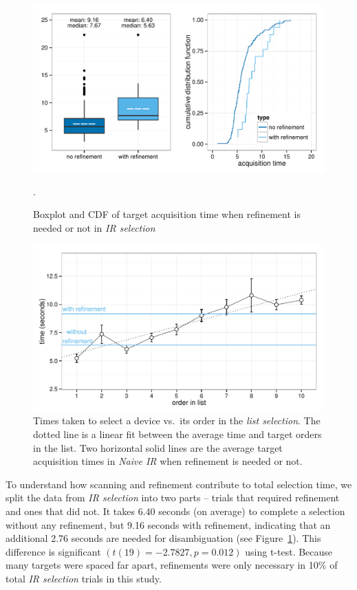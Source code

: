 \begin{figure}[t]
\centering
\includegraphics[width=1.0\columnwidth]{figures/result_study1b.pdf}
\caption{Boxplot and CDF of target acquisition time when refinement is needed or not in {\em IR selection}}.
\label{fig:with_without_refinement}
\end{figure}

\begin{figure}[t]
\centering
\includegraphics[width=1.0\columnwidth]{figures/result_study1c.pdf}
\caption{Times taken to select a device vs.~its order in the {\em list selection}. The dotted line is a linear fit between the average time and target orders in the list. Two horizontal solid lines are the average target acquisition times in {\em Naive IR} when refinement is needed or not.}
\label{fig:time-vs-list-order}
\end{figure}

To understand how scanning and refinement contribute to total selection time, we split the data from {\em IR selection} into two parts -- trials that required refinement and ones that did not. It takes 6.40 seconds (on average) to complete  a selection without any refinement, but 9.16 seconds with refinement, indicating that an additional 2.76 seconds are needed for disambiguation (see Figure~\ref{fig:with_without_refinement}). This difference is significant $(t(19)=-2.7827, p=0.012)$ using t-test.
Because many targets were spaced far apart, refinements were only necessary in 10\% of total {\em IR selection} trials in this study.

